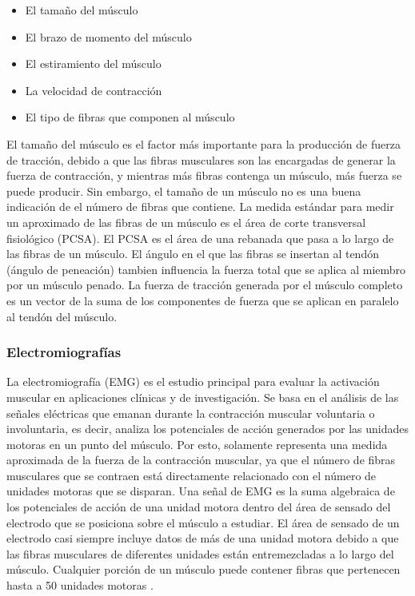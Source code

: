 \begin{itemize}
	\item El tamaño del músculo
	\item El brazo de momento del músculo
	\item El estiramiento del músculo
	\item La velocidad de contracción
	\item El tipo de fibras que componen al músculo
\end{itemize}

El tamaño del músculo es el factor más importante para la producción de fuerza de tracción, debido a que las fibras musculares son las encargadas de generar la fuerza de contracción, y mientras más fibras contenga un músculo, más fuerza se puede producir. Sin embargo, el tamaño de un músculo no es una buena indicación de el número de fibras que contiene. La medida estándar para medir un aproximado de las fibras de un músculo es el área de corte transversal fisiológico (PCSA). El PCSA es el área de una rebanada que pasa a lo largo de las fibras de un músculo. El ángulo en el que las fibras se insertan al tendón (ángulo de peneación) tambien influencia la fuerza total que se aplica al miembro por un músculo penado. La fuerza de tracción generada por el músculo completo es un vector de la suma de los componentes de fuerza que se aplican en paralelo al tendón del músculo.

\subsubsection{Electromiografías}
\label{section:emg}

La electromiografía (EMG) es el estudio principal para evaluar la activación muscular en aplicaciones clínicas y de investigación. Se basa en el análisis de las señales eléctricas que emanan durante la contracción muscular voluntaria o involuntaria, es decir, analiza los potenciales de acción generados por las unidades motoras en un punto del músculo. Por esto, solamente representa una medida aproximada de la fuerza de la contracción muscular, ya que el número de fibras musculares que se contraen está directamente relacionado con el número de unidades motoras que se disparan. Una señal de EMG es la suma algebraica de los potenciales de acción de una unidad motora dentro del área de sensado del electrodo que se posiciona sobre el músculo a estudiar. El área de sensado de un electrodo casi siempre incluye datos de más de una unidad motora debido a que las fibras musculares de diferentes unidades están entremezcladas a lo largo del músculo. Cualquier porción de un músculo puede contener fibras que pertenecen hasta a 50 unidades motoras \citep{kutz2004standard}.

